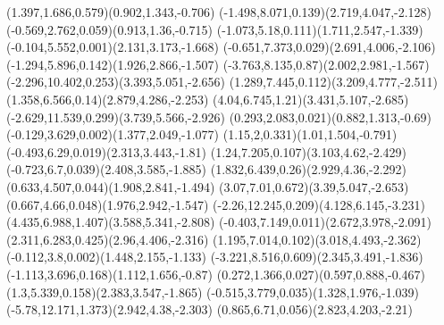 \pstThreeDLine[linecolor=gray](1.397,1.686,0.579)(0.902,1.343,-0.706)
\pstThreeDLine[linecolor=gray](-1.498,8.071,0.139)(2.719,4.047,-2.128)
\pstThreeDLine[linecolor=gray](-0.569,2.762,0.059)(0.913,1.36,-0.715)
\pstThreeDLine[linecolor=gray](-1.073,5.18,0.111)(1.711,2.547,-1.339)
\pstThreeDLine[linecolor=gray](-0.104,5.552,0.001)(2.131,3.173,-1.668)
\pstThreeDLine[linecolor=gray](-0.651,7.373,0.029)(2.691,4.006,-2.106)
\pstThreeDLine[linecolor=gray](-1.294,5.896,0.142)(1.926,2.866,-1.507)
\pstThreeDLine[linecolor=gray](-3.763,8.135,0.87)(2.002,2.981,-1.567)
\pstThreeDLine[linecolor=gray](-2.296,10.402,0.253)(3.393,5.051,-2.656)
\pstThreeDLine[linecolor=gray](1.289,7.445,0.112)(3.209,4.777,-2.511)
\pstThreeDLine[linecolor=gray](1.358,6.566,0.14)(2.879,4.286,-2.253)
\pstThreeDLine[linecolor=gray](4.04,6.745,1.21)(3.431,5.107,-2.685)
\pstThreeDLine[linecolor=gray](-2.629,11.539,0.299)(3.739,5.566,-2.926)
\pstThreeDLine[linecolor=gray](0.293,2.083,0.021)(0.882,1.313,-0.69)
\pstThreeDLine[linecolor=gray](-0.129,3.629,0.002)(1.377,2.049,-1.077)
\pstThreeDLine[linecolor=gray](1.15,2,0.331)(1.01,1.504,-0.791)
\pstThreeDLine[linecolor=gray](-0.493,6.29,0.019)(2.313,3.443,-1.81)
\pstThreeDLine[linecolor=gray](1.24,7.205,0.107)(3.103,4.62,-2.429)
\pstThreeDLine[linecolor=gray](-0.723,6.7,0.039)(2.408,3.585,-1.885)
\pstThreeDLine[linecolor=gray](1.832,6.439,0.26)(2.929,4.36,-2.292)
\pstThreeDLine[linecolor=gray](0.633,4.507,0.044)(1.908,2.841,-1.494)
\pstThreeDLine[linecolor=gray](3.07,7.01,0.672)(3.39,5.047,-2.653)
\pstThreeDLine[linecolor=gray](0.667,4.66,0.048)(1.976,2.942,-1.547)
\pstThreeDLine[linecolor=gray](-2.26,12.245,0.209)(4.128,6.145,-3.231)
\pstThreeDLine[linecolor=gray](4.435,6.988,1.407)(3.588,5.341,-2.808)
\pstThreeDLine[linecolor=gray](-0.403,7.149,0.011)(2.672,3.978,-2.091)
\pstThreeDLine[linecolor=gray](2.311,6.283,0.425)(2.96,4.406,-2.316)
\pstThreeDLine[linecolor=gray](1.195,7.014,0.102)(3.018,4.493,-2.362)
\pstThreeDLine[linecolor=gray](-0.112,3.8,0.002)(1.448,2.155,-1.133)
\pstThreeDLine[linecolor=gray](-3.221,8.516,0.609)(2.345,3.491,-1.836)
\pstThreeDLine[linecolor=gray](-1.113,3.696,0.168)(1.112,1.656,-0.87)
\pstThreeDLine[linecolor=gray](0.272,1.366,0.027)(0.597,0.888,-0.467)
\pstThreeDLine[linecolor=gray](1.3,5.339,0.158)(2.383,3.547,-1.865)
\pstThreeDLine[linecolor=gray](-0.515,3.779,0.035)(1.328,1.976,-1.039)
\pstThreeDLine[linecolor=gray](-5.78,12.171,1.373)(2.942,4.38,-2.303)
\pstThreeDLine[linecolor=gray](0.865,6.71,0.056)(2.823,4.203,-2.21)
